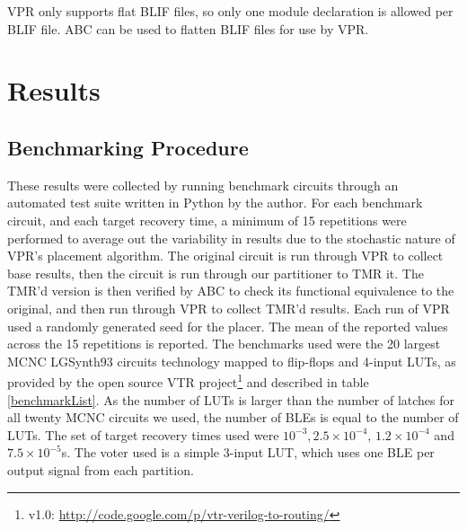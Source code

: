 \documentclass[12pt,final,oneside]{dwThesis} %
\begin{document}
   \gls{VPR} only supports flat \gls{BLIF} files, so only one module
   declaration is allowed per \gls{BLIF} file. \gls{ABC} can be used to flatten
   \gls{BLIF} files for use by \gls{VPR}.




   \chapter{Results}

   \section{Benchmarking Procedure}
   These results were
   collected by running benchmark circuits through an automated test suite
   written in Python by the author. For each benchmark circuit, and each target
   recovery time, a minimum of 15 repetitions were performed to average out the variability
   in results due to the stochastic nature of \gls{VPR}'s placement algorithm.
   The original circuit is run through VPR to collect base results, then the
   circuit is run through our partitioner to TMR it. The TMR'd version is then
   verified by \gls{ABC} to check its functional equivalence to the original,
   and then run through VPR to collect TMR'd results. Each run of VPR used a
   randomly generated seed for the placer.  The mean of the reported values
   across the 15 repetitions is reported.  The benchmarks used were the 20
   largest \gls{MCNC} LGSynth93 circuits technology mapped to flip-flops and 4-input \glspl{LUT}, as provided by the open source
   \gls{VTR} project\footnote{v1.0: \url{http://code.google.com/p/vtr-verilog-to-routing/}} and described in table
   \ref{benchmarkList}.
   As the number of \glspl{LUT} is larger than the number of latches for all twenty \gls{MCNC} circuits we used, the number of \glspl{BLE} is equal to the number of \glspl{LUT}.
    The set of target recovery times used were $10^{-3},
   2.5\times10^{-4}$, $1.2\times10^{-4}$ and $7.5\times10^{-5}$s.  The voter used is a simple
   3-input \gls{LUT}, which uses one \gls{BLE} per output signal from each
   partition.
\end{document}
